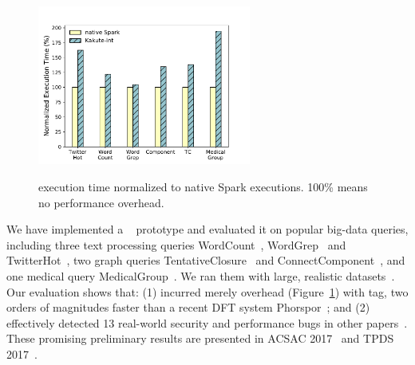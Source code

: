 \begin{figure}
  \vspace{-.1in}
  \includegraphics[width=7cm]{figures/time_overhead.pdf}\\
  \vspace{-.3in}
  \caption{\kakute execution time normalized to native Spark executions. 100\% 
means no performance overhead.}
  \label{fig:scalability}
\end{figure}

 We have implemented a \kakute~\cite{kakute:acsac17} 
prototype 
and evaluated it on \appeval popular big-data queries, including three text 
processing queries WordCount~\cite{spark:example}, 
WordGrep~\cite{newt:socc13} and TwitterHot~\cite{spark:example}, two graph 
queries TentativeClosure~\cite{spark:example}
and ConnectComponent~\cite{spark:example}, and one medical query
MedicalGroup~\cite{pigmix}.
We ran them with large, realistic datasets~\cite{vldb16:output, 
icse16:bigdebug, vldb15:titian}.
Our evaluation shows that: (1) \kakute 
incurred merely \timeavg overhead (Figure~\ref{fig:scalability}) with 
 tag, two orders of magnitudes faster than a recent DFT 
system Phorspor~\cite{oo14:phosphor}; and (2) \kakute effectively 
detected 13 real-world security and performance bugs in other 
papers~\cite{arthur:dave2013,icse16:bigdebug,airavat:nsdi10}. These promising 
preliminary results are presented in ACSAC 2017~\cite{kakute:acsac17} and TPDS 
2017~\cite{confluence:tpds17}.












